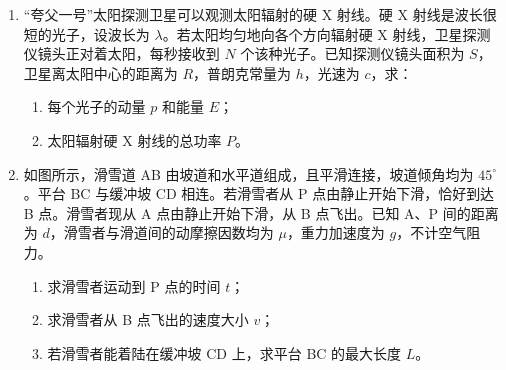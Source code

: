 \documentclass[\gkver]{gaokaozhenti}
\begin{document}
\begin{enumerate}
{发光体做匀速圆周运动，则静摩擦力充当做圆周运动的向心力，则静摩擦力大小为 $f=m\omega_{0}^{2}r$
}

\item
“夸父一号”太阳探测卫星可以观测太阳辐射的硬 X 射线。硬 X 射线是波长很短的光子，设波长为 $\lambda$。若太阳均匀地向各个方向辐射硬 X 射线，卫星探测仪镜头正对着太阳，每秒接收到 $N$ 个该种光子。已知探测仪镜头面积为 $S$，卫星离太阳中心的距离为 $R$，普朗克常量为 $h$，光速为 $c$，求：
\begin{enumerate}
	\item
	每个光子的动量 $p$ 和能量 $E$；
	\item
	太阳辐射硬 X 射线的总功率 $P$。
\end{enumerate}

\item
如图所示，滑雪道 AB 由坡道和水平道组成，且平滑连接，坡道倾角均为 $45^{\circ}$。平台 BC 与缓冲坡 CD 相连。若滑雪者从 P 点由静止开始下滑，恰好到达 B 点。滑雪者现从 A 点由静止开始下滑，从 B 点飞出。已知 A、P 间的距离为 $d$，滑雪者与滑道间的动摩擦因数均为 $\mu$，重力加速度为 $g$，不计空气阻力。
\begin{enumerate}
	\item
	求滑雪者运动到 P 点的时间 $t$；
	\item
	求滑雪者从 B 点飞出的速度大小 $v$；
	\item
	若滑雪者能着陆在缓冲坡 CD 上，求平台 BC 的最大长度 $L$。
\end{enumerate}


\end{enumerate}
\end{document}
